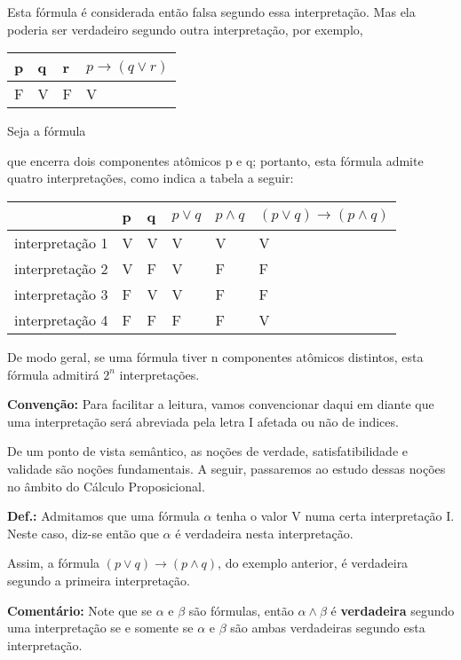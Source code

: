 Esta fórmula é considerada então falsa segundo essa interpretação. Mas ela poderia ser verdadeiro segundo outra interpretação, por exemplo,

\begin{center}
    \begin{tabular}{l l l l}
        p & q & r & $p \to (q \lor r)$ \\ \hline
        F & V & F & V
    \end{tabular}
\end{center}

\begin{exemplo}
    Seja a fórmula 
\end{exemplo}
\noindent que encerra dois componentes atômicos p e q; portanto, esta fórmula admite quatro interpretações, como indica a tabela a seguir:

\begin{center}
    \begin{tabular}{l l l l l l}
                        & p & q & $p \lor q$ & $p \land q$ & $(p \lor q) \to (p \land q)$ \\ \hline
        interpretação 1 & V & V & V          & V            & V \\
        interpretação 2 & V & F & V          & F            & F \\
        interpretação 3 & F & V & V          & F            & F \\
        interpretação 4 & F & F & F          & F            & V
    \end{tabular}
\end{center}

De modo geral, se uma fórmula tiver n componentes atômicos distintos, esta fórmula admitirá $2^n$ interpretações.

\bigskip
\noindent \textbf{Convenção:} Para facilitar a leitura, vamos convencionar daqui em diante que uma interpretação será abreviada pela letra I afetada ou não de indices.


De um ponto de vista semântico, as noções de verdade, satisfatibilidade e validade são noções fundamentais.
A  seguir, passaremos ao  estudo dessas noções no  âmbito do  Cálculo Proposicional.

\bigskip
\textbf{Def.:} Admitamos que uma fórmula $\alpha$ tenha o valor V numa certa interpretação I. Neste caso, diz-se então que $\alpha$ é verdadeira nesta interpretação.

Assim, a fórmula $(p \lor q) \to (p \land q)$, do exemplo anterior, é verdadeira segundo a primeira interpretação.

\bigskip
\noindent \textbf{Comentário:} Note que se $\alpha$ e $\beta$ são fórmulas, então $\alpha \land \beta$ é \textbf{verdadeira} segundo uma interpretação se e somente se $\alpha$ e $\beta$ são ambas verdadeiras segundo esta interpretação.
